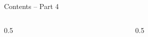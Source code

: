 \documentclass[aspectratio=169,11pt]{beamer}
\subtitle{Part 4: Regression}
\begin{document}
\begin{frame}
  \titlepage
\end{frame}

\aboutlecturer

\courseoverview

\begin{frame}{Contents -- Part 4}
  \begin{columns}[T]
    \begin{column}{0.5\textwidth}
      \tableofcontents[hideallsubsections,sections={1-3}]
    \end{column}
    \begin{column}{0.5\textwidth}
      \tableofcontents[hideallsubsections,sections={4-6}]
    \end{column}
  \end{columns}
\end{frame}
\end{document}
